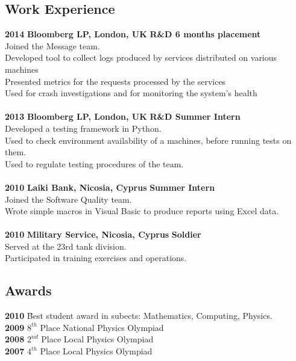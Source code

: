 \documentclass[a4paper,10pt]{article}
\begin{document}
\subsection*{Work Experience}
\begin{tabbing}
{\bf 2014} \hspace{49pt} \= {\bf Bloomberg LP, London, UK} \` {\bf R\&D 6 months placement}\\
\>Joined the Message team.\\
\>Developed tool to collect logs produced by services distributed on various machines\\
\>Presented metrics for the requests processed by the services\\
\>Used for crash investigations and for monitoring the system's health\\
\\
{\bf 2013} \hspace{49pt} \= {\bf Bloomberg LP, London, UK} \` {\bf R\&D Summer Intern}\\
\>Developed a testing framework in Python.\\
\>Used to check environment availability of a machines, before running tests on them.\\
\>Used to regulate testing procedures of the team.\\
\\
{\bf 2010} \> {\bf Laiki Bank, Nicosia, Cyprus} \` {\bf Summer Intern}\\
\>Joined the Software Quality team.\\
\>Wrote simple macros in Visual Basic to produce reports using Excel data.\\
\\
{\bf 2010} \> {\bf Military Service, Nicosia, Cyprus} \` {\bf Soldier}\\
\>Served at the 23rd  tank division.\\
\>Participated in training exercises and operations.\\
\end{tabbing}


\onehalfspacing

\subsection*{Awards}
\begin{tabbing}
{\bf 2010} \hspace{49pt} \= Best student award in subects: Mathematics, Computing, Physics.\\
{\bf 2009} \> $8^{th}$ Place National Physics Olympiad\\
{\bf 2008} \> $2^{nd}$ Place Local Physics Olympiad\\
{\bf 2007} \> $4^{th}$ Place Local Physics Olympiad\\
\end{tabbing}
\end{document}
